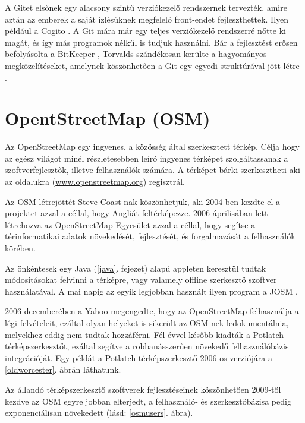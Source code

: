 \documentclass[a4paper,12pt]{report}
\begin{document}
\vspace{2mm}
A Gitet elsőnek egy alacsony szintű verziókezelő rendszernek tervezték, amire aztán az emberek a saját ízlésüknek megfelelő front-endet fejleszthettek. Ilyen például a Cogito \cite{cogito}. A Git mára már egy teljes verziókezelő rendszerré nőtte ki magát, és így más programok nélkül is tudjuk használni. Bár a fejlesztést erősen befolyásolta a BitKeeper \cite{bitkeeper}, Torvalds szándékosan kerülte a hagyományos megközelítéseket, amelynek köszönhetően a Git egy egyedi struktúrával jött létre \cite{gitunique}.

\newpage
\section{OpentStreetMap (OSM)}
\label{osm}

Az OpenStreetMap egy ingyenes, a közösség által szerkesztett térkép. Célja hogy az egész világot minél részletesebben leíró ingyenes térképet szolgáltassanak a szoftverfejlesztők, illetve felhasználók számára. A térképet bárki szerkesztheti aki az oldalukra (\url{www.openstreetmap.org}) regisztrál. 

\vspace{2mm}
Az OSM létrejöttét Steve Coast-nak köszönhetjük, aki 2004-ben kezdte el a projektet azzal a céllal, hogy Angliát feltérképezze. 2006 áprilisában lett létrehozva az OpenStreetMap Egyesület azzal a céllal, hogy segítse a térinformatikai adatok növekedését, fejlesztését, és forgalmazását a felhasználók körében.

\vspace{2mm}
Az önkéntesek egy Java (\ref{java}. fejezet) alapú appleten keresztül tudtak módosításokat felvinni a térképre, vagy valamely offline szerkesztő szoftver használatával. A mai napig az egyik legjobban használt ilyen program a JOSM \cite{josm}.

\vspace{2mm}
2006 decemberében a Yahoo megengedte, hogy az OpenStreetMap felhasználja a légi felvételeit, ezáltal olyan helyeket is sikerült az OSM-nek ledokumentálnia, melyekhez eddig nem tudtak hozzáférni. Fél évvel később kiadták a Potlatch \cite{potlatch} térképszerkesztőt, ezáltal segítve a robbanásszerűen növekedő felhasználóbázis integrációját. Egy példát a Potlatch térképszerkesztő 2006-os verziójára a \ref{oldworcester}. ábrán láthatunk.

\newpage
Az állandó térképszerkesztő szoftverek fejlesztéseinek köszönhetően 2009-től kezdve az OSM egyre jobban elterjedt, a felhasználó- és szerkesztőbázisa pedig exponenciálisan növekedett (lásd: \ref{osmusers}. ábra).
\end{document}
